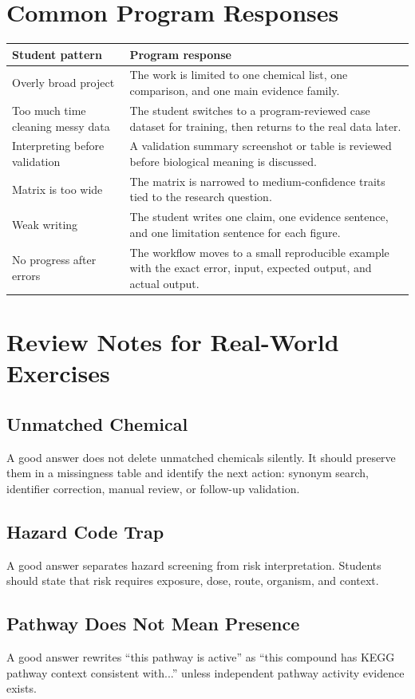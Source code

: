 \section{Common Program Responses}
\begin{tabularx}{\textwidth}{p{}Y}
\toprule
\textbf{Student pattern} & \textbf{Program response}\\
\midrule
Overly broad project & The work is limited to one chemical list, one comparison, and one main evidence family.\\
Too much time cleaning messy data & The student switches to a program-reviewed case dataset for training, then returns to the real data later.\\
Interpreting before validation & A validation summary screenshot or table is reviewed before biological meaning is discussed.\\
Matrix is too wide & The matrix is narrowed to medium-confidence traits tied to the research question.\\
Weak writing & The student writes one claim, one evidence sentence, and one limitation sentence for each figure.\\
No progress after errors & The workflow moves to a small reproducible example with the exact error, input, expected output, and actual output.\\
\bottomrule
\end{tabularx}

\section{Review Notes for Real-World Exercises}
\subsection{Unmatched Chemical}
A good answer does not delete unmatched chemicals silently. It should preserve them in a missingness table and identify the next action: synonym search, identifier correction, manual review, or follow-up validation.

\subsection{Hazard Code Trap}
A good answer separates hazard screening from risk interpretation. Students should state that risk requires exposure, dose, route, organism, and context.

\subsection{Pathway Does Not Mean Presence}
A good answer rewrites ``this pathway is active'' as ``this compound has KEGG pathway context consistent with...'' unless independent pathway activity evidence exists.

